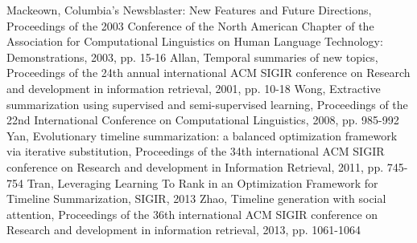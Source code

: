 \documentclass[print]{jicspack}
\begin{document}
\begin{thebibliography}{00}
 Mackeown, Columbia's Newsblaster: New Features and Future Directions, Proceedings of the 2003 Conference of the North American Chapter of the Association for Computational Linguistics on Human Language Technology: Demonstrations, 2003, pp. 15-16
 Allan, Temporal summaries of new topics, Proceedings of the 24th annual international ACM SIGIR conference on Research and development in information retrieval, 2001, pp. 10-18
 Wong, Extractive summarization using supervised and semi-supervised learning, Proceedings of the 22nd International Conference on Computational Linguistics, 2008, pp. 985-992
 Yan, Evolutionary timeline summarization: a balanced optimization framework via iterative substitution, Proceedings of the 34th international ACM SIGIR conference on Research and development in Information Retrieval, 2011, pp. 745-754
 Tran, Leveraging Learning To Rank in an Optimization Framework for Timeline Summarization, SIGIR, 2013
 Zhao, Timeline generation with social attention, Proceedings of the 36th international ACM SIGIR conference on Research and development in information retrieval, 2013, pp. 1061-1064



\end{thebibliography}
\end{document}

